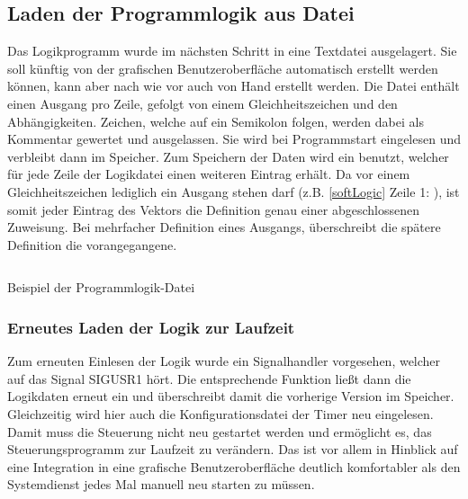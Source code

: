 \subsection{Laden der Programmlogik aus Datei}\label{kap:ums:logicOutsource}
Das Logikprogramm wurde im nächsten Schritt in eine Textdatei ausgelagert. Sie soll künftig von der grafischen Benutzeroberfläche automatisch erstellt werden können, kann aber nach wie vor auch von Hand erstellt werden. Die Datei enthält einen Ausgang pro Zeile, gefolgt von einem Gleichheitszeichen und den Abhängigkeiten. Zeichen, welche auf ein Semikolon folgen, werden dabei als Kommentar gewertet und ausgelassen. Sie wird bei Programmstart eingelesen und verbleibt dann im Speicher. Zum Speichern der Daten wird ein  benutzt, welcher für jede Zeile der Logikdatei einen weiteren Eintrag erhält. Da vor einem Gleichheitszeichen lediglich ein Ausgang stehen darf (z.B. \ref{softLogic} Zeile 1: ), ist somit jeder Eintrag des Vektors die Definition genau einer abgeschlossenen Zuweisung. Bei mehrfacher Definition eines Ausgangs, überschreibt die spätere Definition die vorangegangene. 

\begin{listing}[H]
	\inputminted[numbersep=1pt,fontsize=\scriptsize,frame=single, firstline=29,lastline=36]{c}{./code/logic.conf}
	\caption{Beispiel der Programmlogik-Datei}
	\label{code:softLogic}
\end{listing}


\subsubsection{Erneutes Laden der Logik zur Laufzeit}\label{kap:ums:reloadConf}
Zum erneuten Einlesen der Logik wurde ein Signalhandler vorgesehen, welcher auf das Signal SIGUSR1 hört. Die entsprechende Funktion ließt dann die Logikdaten erneut ein und überschreibt damit die vorherige Version im Speicher. Gleichzeitig wird hier auch die Konfigurationsdatei der Timer neu eingelesen. Damit muss die Steuerung nicht neu gestartet werden und ermöglicht es, das Steuerungsprogramm zur Laufzeit zu verändern. Das ist vor allem in Hinblick auf eine Integration in eine grafische Benutzeroberfläche deutlich komfortabler als den Systemdienst jedes Mal manuell neu starten zu müssen.

